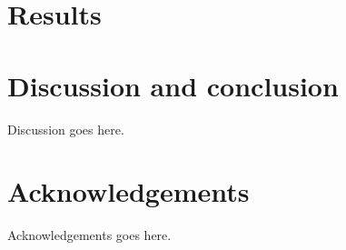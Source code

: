 \documentclass[aps,prd,twocolumn,superscriptaddress,amsfont,amssymb,amsmath,nofootinbib,showpacs,balancelastpage]{revtex4-1}
\begin{document}

\section{Results}\label{sec.results}





\section{Discussion and conclusion}\label{sec.discussion}
Discussion goes here.

\section*{Acknowledgements}
Acknowledgements goes here.

%


\end{document}
